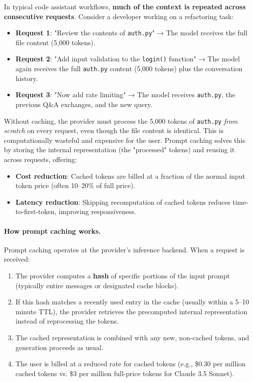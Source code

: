 \documentclass[english]{article}
\begin{document}
In typical code assistant workflows, \textbf{much of the context is repeated across consecutive requests}. Consider a developer working on a refactoring task:
\begin{itemize}
    \item \textbf{Request 1}: "Review the contents of \texttt{auth.py}" → The model receives the full file content (5,000 tokens).
    \item \textbf{Request 2}: "Add input validation to the \texttt{login()} function" → The model again receives the full \texttt{auth.py} content (5,000 tokens) plus the conversation history.
    \item \textbf{Request 3}: "Now add rate limiting" → The model receives \texttt{auth.py}, the previous Q\&A exchanges, and the new query.
\end{itemize}

Without caching, the provider must process the 5,000 tokens of \texttt{auth.py} \emph{from scratch} on every request, even though the file content is identical. This is computationally wasteful and expensive for the user. Prompt caching solves this by storing the internal representation (the "processed" tokens) and reusing it across requests, offering:
\begin{itemize}
    \item \textbf{Cost reduction}: Cached tokens are billed at a fraction of the normal input token price (often 10--20\% of full price).
    \item \textbf{Latency reduction}: Skipping recomputation of cached tokens reduces time-to-first-token, improving responsiveness.
\end{itemize}

\paragraph{How prompt caching works.}

Prompt caching operates at the provider's inference backend. When a request is received:
\begin{enumerate}
    \item The provider computes a \textbf{hash} of specific portions of the input prompt (typically entire messages or designated cache blocks).
    \item If this hash matches a recently used entry in the cache (usually within a 5--10 minute TTL), the provider retrieves the precomputed internal representation instead of reprocessing the tokens.
    \item The cached representation is combined with any new, non-cached tokens, and generation proceeds as usual.
    \item The user is billed at a reduced rate for cached tokens (e.g., \$0.30 per million cached tokens vs. \$3 per million full-price tokens for Claude 3.5 Sonnet).
\end{enumerate}
\end{document}
